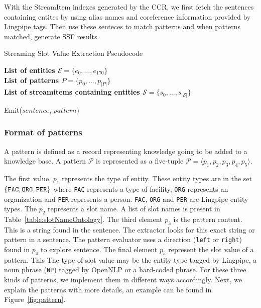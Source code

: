 With the StreamItem indexes generated by the CCR, we first fetch the sentences containing entites by using alias names and coreference information provided by Lingpipe tags. Then use these senteces to match patterns and when patterns matched, generate SSF results.

\begin{algorithm}
  \caption{Streaming Slot Value Extraction Pseudocode}
  \textbf{List of entities $\mathcal{E} = \{e_0, \ldots, e_{170}\}$}\\
  \textbf{List of patterns $P = \{p_0, \ldots, p_{|P|}\}$}\\
  \textbf{List of streamitems containing entities $\mathcal{S} = \{s_0, \ldots, s_{|\mathcal{S}|}\}$}\\
  
  \begin{algorithmic}%
                \STATE Emit($sentence$, $pattern$)
              \ENDIF
	    \ENDFOR
          \ENDIF
        \ENDFOR
      \ENDFOR
    \ENDFOR
  \end{algorithmic}
\end{algorithm}


\subsubsection{Format of patterns}
A pattern is defined as a record representing knowledge going to be added to a knowledge base. A pattern $\mathcal{P}$ is represented as a five-tuple $\mathcal{P} = \langle p_1, p_2, p_3, p_4, p_5 \rangle$.


The first value, $p_1$ represents the type of entity. These entity types are in the set $\{ \text{\tt FAC}, \text{\tt ORG}, \text{\tt PER} \}$ where \texttt{FAC} represents a type of facility, \texttt{ORG} represents an organization and \texttt{PER} represents a person. \texttt{FAC}, \texttt{ORG} and \texttt{PER} are Lingpipe entity types. The $p_2$ represents a slot name. A list of slot names is present in Table~\ref{table:slotNameOntology}. The third element $p_3$ is the pattern content. This is a string found in the sentence. The extractor looks for this exact string or pattern in a sentence. The pattern evaluator uses a direction (\texttt{left} or \texttt{right}) found in $p_4$ to explore sentence. The final element $p_5$ represent the slot value of a pattern. This %
The type of slot value may be the entity type tagged by Lingpipe, a noun phrase (\texttt{NP}) tagged by OpenNLP or a hard-coded phrase. For these three kinds of patterns, we implement them in different 
ways accordingly. Next, we explain the patterns with more details, an example can be found in Figure~\ref{fig:pattern}. 



